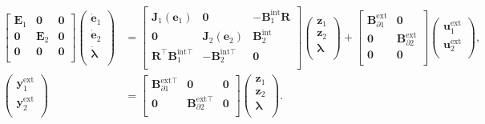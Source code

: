 \begin{equation*}
\begin{aligned}
\begin{bmatrix}
\mathbf{E}_1 & \mathbf{0} & \mathbf{0} \\ 
\mathbf{0} & \mathbf{E}_2 & \mathbf{0} \\
\mathbf{0} & \mathbf{0} & \mathbf{0} \\
\end{bmatrix}
\begin{pmatrix}
\dot{\mathbf{e}}_1 \\ \dot{\mathbf{e}}_2 \\ \dot{\bm{\lambda}} \\
\end{pmatrix} &= 
\begin{bmatrix}
\mathbf{J}_1(\mathbf{e}_1) & \mathbf{0} & -\mathbf{B}_1^{\text{int}} \mathbf{R} \\ 
\mathbf{0} & \mathbf{J}_2(\mathbf{e}_2) & \mathbf{B}_2^{\text{int}} \\
\mathbf{R}^\top \mathbf{B}_1^{\text{int} \top} & - \mathbf{B}_2^{\text{int} \top} & \mathbf{0} \\
\end{bmatrix}
\begin{pmatrix}
\mathbf{z}_1  \\ 
\mathbf{z}_2  \\ 
\bm{\lambda} \\
\end{pmatrix}+ 
\begin{bmatrix}
\mathbf{B}_{\partial 1}^{\text{ext}} & \mathbf{0} \\
\mathbf{0} & \mathbf{B}_{\partial 2}^{\text{ext}} \\
\mathbf{0} & \mathbf{0} \\
\end{bmatrix} 
\begin{pmatrix}
\mathbf{u}_1^{\text{ext}} \\ 
\mathbf{u}_2^{\text{ext}} \\
\end{pmatrix}, \\
\begin{pmatrix}
\mathbf{y}_1^{\text{ext}} \\ \mathbf{y}_2^{\text{ext}} \\
\end{pmatrix}  &= \begin{bmatrix}
\mathbf{B}_{\partial 1}^{\text{ext} \top} & \mathbf{0} & \mathbf{0} \\
\mathbf{0} & \mathbf{B}_{\partial 2}^{\text{ext} \top} & \mathbf{0} \\
\end{bmatrix} \begin{pmatrix}
\mathbf{z}_1  \\ 
\mathbf{z}_2  \\ 
\bm{\lambda} \\
\end{pmatrix}.
\end{aligned}
\end{equation*}

